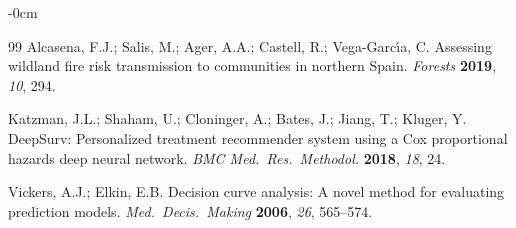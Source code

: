 \documentclass[fire,article,submit,pdftex]{../Definitions/mdpi}
\begin{document}
\begin{adjustwidth}{-\extralength}{0cm}
\begin{thebibliography}{99}
Alcasena, F.J.; Salis, M.; Ager, A.A.; Castell, R.; Vega-Garc\'{\i}a, C.
Assessing wildland fire risk transmission to communities in northern Spain.
\textit{Forests} \textbf{2019}, \textit{10}, 294.

Katzman, J.L.; Shaham, U.; Cloninger, A.; Bates, J.; Jiang, T.; Kluger, Y.
DeepSurv: Personalized treatment recommender system using a Cox proportional hazards deep neural network.
\textit{BMC Med.\ Res.\ Methodol.} \textbf{2018}, \textit{18}, 24.

Vickers, A.J.; Elkin, E.B.
Decision curve analysis: A novel method for evaluating prediction models.
\textit{Med.\ Decis.\ Making} \textbf{2006}, \textit{26}, 565--574.

\end{thebibliography}
\end{adjustwidth}
\end{document}
